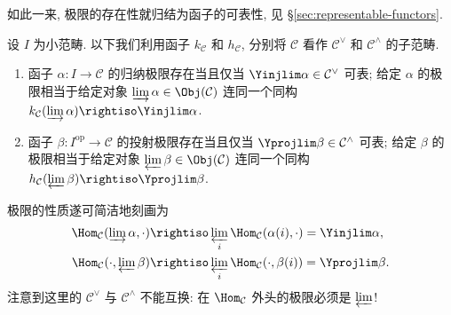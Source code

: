 如此一来, 极限的存在性就归结为函子的可表性, 见 \S\ref{sec:representable-functors}.

\begin{proposition}\label{prop:lim-as-fct}
	设 $I$ 为小范畴. 以下我们利用函子 $k_{\mathcal{C}}$ 和 $h_{\mathcal{C}}$, 分别将 $\mathcal{C}$ 看作 $\mathcal{C}^\vee$ 和 $\mathcal{C}^\wedge$ 的子范畴.
	\begin{enumerate}
		\item 函子 $\alpha: I \to \mathcal{C}$ 的归纳极限存在当且仅当 $\Yinjlim \alpha \in \mathcal{C}^\vee$ 可表; 给定 $\alpha$ 的极限相当于给定对象 $\varinjlim \alpha \in \Obj(\mathcal{C})$ 连同一个同构 $k_{\mathcal{C}}(\varinjlim \alpha) \rightiso \Yinjlim \alpha$.
		\item 函子 $\beta: I^\text{op} \to \mathcal{C}$ 的投射极限存在当且仅当 $\Yprojlim \beta \in \mathcal{C}^\wedge$ 可表; 给定 $\beta$ 的极限相当于给定对象 $\varprojlim \beta \in \Obj(\mathcal{C})$ 连同一个同构 $h_{\mathcal{C}}(\varprojlim \beta) \rightiso \Yprojlim \beta$.
	\end{enumerate}
\end{proposition}
极限的性质遂可简洁地刻画为
\begin{align*}
	\Hom_{\mathcal{C}}(\varinjlim \alpha, \cdot) & \rightiso \varprojlim_i \Hom_{\mathcal{C}}(\alpha(i), \cdot) = \Yinjlim \alpha, \\
	\Hom_{\mathcal{C}}(\cdot, \varprojlim \beta) & \rightiso \varprojlim_i \Hom_{\mathcal{C}}(\cdot, \beta(i)) = \Yprojlim \beta.
\end{align*}
注意到这里的 $\mathcal{C}^\vee$ 与 $\mathcal{C}^\wedge$ 不能互换: 在 $\Hom_{\mathcal{C}}$ 外头的极限必须是 $\varprojlim$!

